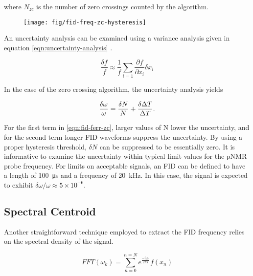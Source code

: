 \noindent 
where $N_{zc}$ is the number of zero crossings counted by the algorithm.

\begin{figure}
\label{fig:fid-freq-zc-hysteresis}
\texttt{[image: fig/fid-freq-zc-hysteresis]}
\end{figure}

An uncertainty analysis can be examined using a variance analysis given in equation \ref{eqn:uncertainty-analysis} .

\begin{equation}
\label{eqn:uncertainty-analysis}
\frac{\delta f}{f} \approx \frac{1}{f} \sum_{i = 1} \frac{\partial f}{\partial x_i} \delta x_i
\end{equation}

\noindent
In the case of the zero crossing algorithm, the uncertainty analysis yields

\begin{equation}
\label{eqn:fid-ferr-zc}
\frac{\delta \omega}{\omega} = \frac{\delta N}{N} \\
+ \frac{\delta \Delta T}{\Delta T}.
\end{equation}

\noindent
For the first term in \ref{eqn:fid-ferr-zc}, larger values of N lower the uncertainty, and for the second term longer FID waveforms suppress the uncertainty.  By using a proper hysteresis threshold, $\delta N$ can be suppressed to be essentially zero. It is informative to examine the uncertainty within typical limit values for the pNMR probe frequency.  For limits on acceptable signals, an FID can be defined to have a length of \SI{100}{\micro \second} and a frequency of \SI{20}{\kHz}.  In this case, the signal is expected to exhibit $\delta \omega / \omega \approx 5 \times 10^{-6}$. 


\subsection{Spectral Centroid}
Another straightforward technique employed to extract the FID frequency relies on the spectral density of the signal. 

\begin{equation}
\label{eqn:fid-fft}
FFT(\omega_k) = \sum_{n=0}^{n=N} e^\frac{-i \omega_0}{2\pi k} f(x_n)
\end{equation}

